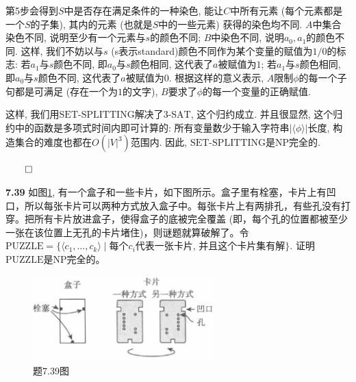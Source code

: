 \documentclass[UTF8]{report}
\newcommand{\problem}[1]{{\setlength{\parskip}{10pt}\noindent \bf{#1}}}
\renewenvironment{proof}{{\setlength{\parskip}{7pt}\noindent\hskip 2em \bf 证明 \quad}}{\hfill$\qed$\par}
\newcommand{\NP}{\mathrm{NP}}
\newcommand{\threeSAT}{\mathrm{3\text{-}SAT}}
\newcommand{\SetSp}{\mathrm{SET\text{-}SPLITTING}}
\newcommand{\PUZZLE}{\mathrm{PUZZLE}}
\begin{document}
\begin{proof}
\begin{enumerate}
        第5步会得到$S$中是否存在满足条件的一种染色, 能让$C$中所有元素 (每个元素都是一个$S$的子集), 其内的元素 (也就是$S$中的一些元素) 获得的染色均不同. $A$中集合染色不同, 说明至少有一个元素与$s$的颜色不同; $B$中染色不同, 说明$a_0, a_1$的颜色不同. 这样, 我们不妨以与$s$ (s表示standard)颜色不同作为某个变量的赋值为$1/0$的标志: 若$a_1$与$s$颜色不同, 即$a_0$与$s$颜色相同, 这代表了$a$被赋值为$1$; 若$a_1$与$s$颜色相同, 即$a_0$与$s$颜色不同, 这代表了$a$被赋值为$0$. 根据这样的意义表示, $A$限制$\phi$的每一个子句都是可满足 (存在一个为$1$的文字), $B$要求了$\phi$的每一个变量的正确赋值.
        
        这样, 我们用$\SetSp$解决了$\threeSAT$, 这个归约成立. 并且很显然, 这个归约中的函数是多项式时间内即可计算的: 所有变量数少于输入字符串$|\langle\phi\rangle|$长度, 构造集合的难度也都在$O(|V|^3)$范围内. 因此, $\SetSp$是$\NP$完全的.
    \end{enumerate}
\end{proof}


\problem{7.39} 如图\ref{fig:7_39}, 有一个盒子和一些卡片，如下图所示。盒子里有栓塞，卡片上有凹口，所以每张卡片可以两种方式放入盒子中。每张卡片上有两排孔，有些孔没有打穿。把所有卡片放进盒子，使得盒子的底被完全覆盖 (即，每个孔的位置都被至少一张在该位置上无孔的卡片堵住)，则谜题就算破解了。令$\PUZZLE = \{ \langle c_1, \dots ,c_k \rangle \mid \text{每个}c_i\text{代表一张卡片, 并且这个卡片集有解}\}$. 证明$\PUZZLE$是$\NP$完全的。
\begin{figure}[!htbp]
    \centering
    \includegraphics[width=7cm]{image/7.39.png}
    \caption{题7.39图}
    \label{fig:7_39}
\end{figure}
\end{document}
